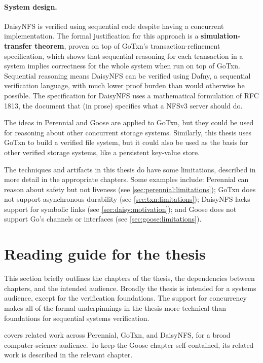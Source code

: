 \paragraph{System design.}
DaisyNFS is verified using sequential code despite having a concurrent
implementation. The formal justification for this approach is a
\textbf{simulation-transfer theorem}, proven on top of GoTxn's
transaction-refinement specification, which shows that sequential reasoning for each
transaction in a system implies correctness for the whole system when run on top
of GoTxn. Sequential reasoning means DaisyNFS can be verified using Dafny, a
sequential verification language, with much lower proof burden than would
otherwise be possible. The specification for DaisyNFS uses a mathematical
formulation of RFC 1813, the document that (in prose) specifies what a NFSv3
server should do.

The ideas in Perennial and Goose are applied to GoTxn, but they could be used
for reasoning about other concurrent storage systems. Similarly,
this thesis uses GoTxn to build a verified file system, but it could also be used
as the basis for other verified storage systems, like a persistent key-value
store.

The techniques and artifacts in this thesis do have some limitations, described
in more detail in the appropriate chapters. Some examples include: Perennial can reason
about safety but not liveness (see \cref{sec:perennial:limitations}); GoTxn does
not support asynchronous durability (see \cref{sec:txn:limitations}); DaisyNFS
lacks support for symbolic links (see \cref{sec:daisy:motivation}); and Goose
does not support Go's channels or interfaces (see \cref{sec:goose:limitations}).

\section{Reading guide for the thesis}
\label{sec:intro:reading-guide}

This section briefly outlines the chapters of the thesis, the dependencies
between chapters, and the intended audience. Broadly the thesis is intended for
a systems audience, except for the verification foundations. The support for
concurrency makes all of the formal underpinnings in the thesis more technical
than foundations for sequential systems verification.

 covers related work across Perennial, GoTxn, and DaisyNFS, for
a broad computer-science audience. To keep the Goose chapter self-contained, its
related work is described in the relevant chapter.

